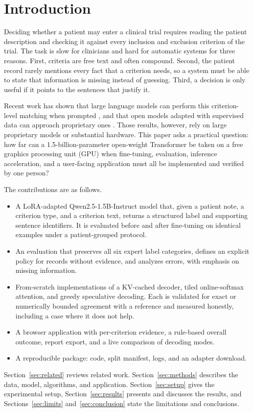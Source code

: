 \documentclass[conference]{IEEEtran}
\begin{document}
\section{Introduction}
Deciding whether a patient may enter a clinical trial requires reading the patient description and checking it against every inclusion and exclusion criterion of the trial. The task is slow for clinicians and hard for automatic systems for three reasons. First, criteria are free text and often compound. Second, the patient record rarely mentions every fact that a criterion needs, so a system must be able to state that information is missing instead of guessing. Third, a decision is only useful if it points to the sentences that justify it.

Recent work has shown that large language models can perform this criterion-level matching when prompted \cite{trialgpt}, and that open models adapted with supervised data can approach proprietary ones \cite{nievas}. Those results, however, rely on large proprietary models or substantial hardware. This paper asks a practical question: how far can a 1.5-billion-parameter open-weight Transformer be taken on a free graphics processing unit (GPU) when fine-tuning, evaluation, inference acceleration, and a user-facing application must all be implemented and verified by one person?

The contributions are as follows.
\begin{itemize}
\item A LoRA-adapted Qwen2.5-1.5B-Instruct model that, given a patient note, a criterion type, and a criterion text, returns a structured label and supporting sentence identifiers. It is evaluated before and after fine-tuning on identical examples under a patient-grouped protocol.
\item An evaluation that preserves all six expert label categories, defines an explicit policy for records without evidence, and analyzes errors, with emphasis on missing information.
\item From-scratch implementations of a KV-cached decoder, tiled online-softmax attention, and greedy speculative decoding. Each is validated for exact or numerically bounded agreement with a reference and measured honestly, including a case where it does not help.
\item A browser application with per-criterion evidence, a rule-based overall outcome, report export, and a live comparison of decoding modes.
\item A reproducible package: code, split manifest, logs, and an adapter download.
\end{itemize}
Section~\ref{sec:related} reviews related work. Section~\ref{sec:methods} describes the data, model, algorithms, and application. Section~\ref{sec:setup} gives the experimental setup, Section~\ref{sec:results} presents and discusses the results, and Sections~\ref{sec:limits} and~\ref{sec:conclusion} state the limitations and conclusions.
\end{document}
